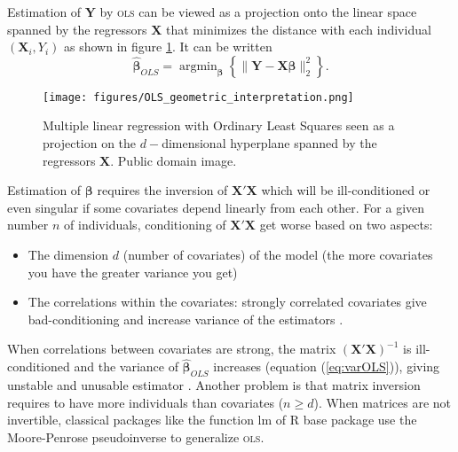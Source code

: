\documentclass[12pt,a4paper]{report}
\begin{document}
	Estimation of $\boldsymbol{Y}$ by \textsc{ols} can be viewed as a projection onto the linear space spanned by the regressors $\boldsymbol{X}$ that minimizes the distance with each individual $(\boldsymbol{X}_i,Y_i)$ as shown in figure \ref{geomOLS}. It can be written
	\begin{equation}
		\boldsymbol{\hat{\beta}}_{OLS}=\operatorname{argmin}_{\boldsymbol{\beta}}\left\lbrace \parallel \boldsymbol{Y}-\boldsymbol{X\beta}\parallel_2^2 \right\rbrace  \nonumber .
	\end{equation}
	\begin{figure}[h!]
	\centering
	\texttt{[image: figures/OLS\_geometric\_interpretation.png]}
	\caption{Multiple linear regression with Ordinary Least Squares seen as a projection on the $d-$dimensional hyperplane spanned by the regressors $\boldsymbol{X}$. Public domain image.} \label{geomOLS}
	\end{figure}
	
	Estimation of $\boldsymbol{\beta}$ requires the inversion of $\boldsymbol{X}'\boldsymbol{X}$ which will be ill-conditioned or even singular if some covariates depend linearly from each other. 
For a given number $n$ of individuals, conditioning of $\boldsymbol{X}'\boldsymbol{X}$ get worse based on two aspects: 
\begin{itemize}
	\item The dimension $d$ (number of covariates) of the model (the more covariates you have the greater variance you get)
	\item The correlations within the covariates: strongly correlated covariates give bad-conditioning and increase variance of the estimators .
\end{itemize}
	When correlations between covariates are strong, the matrix $(\boldsymbol{X}'\boldsymbol{X})^{-1} $ is ill-conditioned and the variance of $\hat{\boldsymbol{\beta}}_{OLS}$ increases (equation (\ref{eq:varOLS})), giving unstable and unusable estimator \cite{hoerl1970ridge}.
	Another problem is that matrix inversion requires to have more individuals than covariates ($n\geq d$).
	When matrices are not invertible, classical packages like the function lm of R base package \cite{packagebase} use the Moore-Penrose pseudoinverse \cite{PSP:2043984} to generalize \textsc{ols}.	\\	
		
\end{document}
